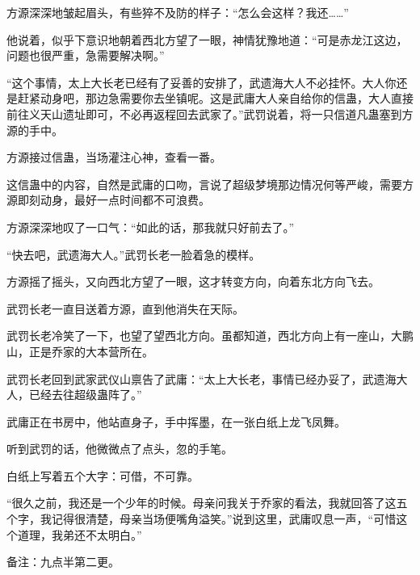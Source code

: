 \begin{this_body}
方源深深地皱起眉头，有些猝不及防的样子：“怎么会这样？我还……”

他说着，似乎下意识地朝着西北方望了一眼，神情犹豫地道：“可是赤龙江这边，问题也很严重，急需要解决啊。”

“这个事情，太上大长老已经有了妥善的安排了，武遗海大人不必挂怀。大人你还是赶紧动身吧，那边急需要你去坐镇呢。这是武庸大人亲自给你的信蛊，大人直接前往义天山遗址即可，不必再返程回去武家了。”武罚说着，将一只信道凡蛊塞到方源的手中。

方源接过信蛊，当场灌注心神，查看一番。

这信蛊中的内容，自然是武庸的口吻，言说了超级梦境那边情况何等严峻，需要方源即刻动身，最好一点时间都不可浪费。

方源深深地叹了一口气：“如此的话，那我就只好前去了。”

“快去吧，武遗海大人。”武罚长老一脸着急的模样。

方源摇了摇头，又向西北方望了一眼，这才转变方向，向着东北方向飞去。

武罚长老一直目送着方源，直到他消失在天际。

武罚长老冷笑了一下，也望了望西北方向。虽都知道，西北方向上有一座山，大鹏山，正是乔家的大本营所在。

武罚长老回到武家武仪山禀告了武庸：“太上大长老，事情已经办妥了，武遗海大人，已经去往超级蛊阵了。”

武庸正在书房中，他站直身子，手中挥墨，在一张白纸上龙飞凤舞。

听到武罚的话，他微微点了点头，忽的手笔。

白纸上写着五个大字：可借，不可靠。

“很久之前，我还是一个少年的时候。母亲问我关于乔家的看法，我就回答了这五个字，我记得很清楚，母亲当场便嘴角溢笑。”说到这里，武庸叹息一声，“可惜这个道理，我弟还不太明白。”

备注：九点半第二更。

\end{this_body}

